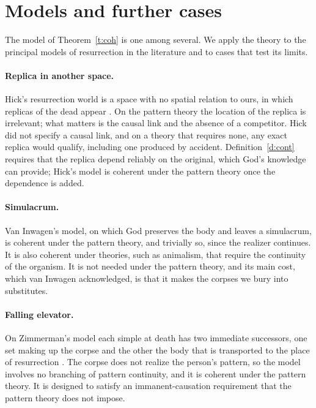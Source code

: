 \documentclass{situationist-preprint}
\begin{document}
\section{Models and further cases}\label{s:cases}

The model of Theorem~\ref{t:coh} is one among several. We apply the theory to the principal models of resurrection in the literature and to cases that test its limits.

\paragraph{Replica in another space.} Hick's resurrection world is a space with no spatial relation to ours, in which replicas of the dead appear \citep{Hick1976}. On the pattern theory the location of the replica is irrelevant; what matters is the causal link and the absence of a competitor. Hick did not specify a causal link, and on a theory that requires none, any exact replica would qualify, including one produced by accident. Definition~\ref{d:cont} requires that the replica depend reliably on the original, which God's knowledge can provide; Hick's model is coherent under the pattern theory once the dependence is added.

\paragraph{Simulacrum.} Van Inwagen's model, on which God preserves the body and leaves a simulacrum, is coherent under the pattern theory, and trivially so, since the realizer continues. It is also coherent under theories, such as animalism, that require the continuity of the organism. It is not needed under the pattern theory, and its main cost, which van Inwagen acknowledged, is that it makes the corpses we bury into substitutes.

\paragraph{Falling elevator.} On Zimmerman's model each simple at death has two immediate successors, one set making up the corpse and the other the body that is transported to the place of resurrection \citep{Zimmerman1999}. The corpse does not realize the person's pattern, so the model involves no branching of pattern continuity, and it is coherent under the pattern theory. It is designed to satisfy an immanent-causation requirement that the pattern theory does not impose.
\end{document}
